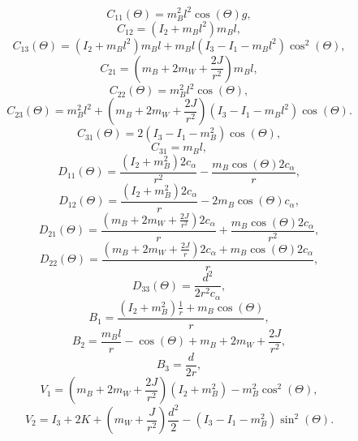 	\begin{equation}
		C_{11}(\Theta) = m_B^2 l^2 \cos(\Theta)g,
	\end{equation}
	\begin{equation}
		C_{12} = (I_2 + m_B l^2) m_B l,
	\end{equation}
	\begin{equation}
		C_{13}(\Theta) = (I_2 + m_B l^2) m_B l + m_B l (I_3 - I_1 - m_B l^2) \cos^2(\Theta),
	\end{equation}
	\begin{equation}
		C_{21} = (m_B + 2m_W + \frac{2J}{r^2}) m_B l,
	\end{equation}
	\begin{equation}
		C_{22}(\Theta) = m_B^2 l^2 \cos(\Theta),
	\end{equation}
	\begin{equation}
		C_{23}(\Theta) = m_B^2 l^2 + (m_B + 2m_W + \frac{2J}{r^2}) (I_3 - I_1 - m_B l^2) \cos(\Theta).
	\end{equation}
	\begin{equation}
		C_{31}(\Theta) = 2 (I_3 - I_1 - m_B^2) \cos(\Theta),
	\end{equation}
	\begin{equation}
		C_{31} = m_B l,
	\end{equation}
	\begin{equation}
		D_{11}(\Theta) = \frac{(I_2 + m_B^2) 2c_\alpha}{r^2} - \frac{m_B \cos(\Theta) 2c_\alpha}{r},
	\end{equation}
	\begin{equation}
		D_{12}(\Theta) = \frac{(I_2 + m_B^2) 2c_\alpha}{r} - 2m_B \cos(\Theta) c_\alpha,
	\end{equation}
	\begin{equation}
		D_{21}(\Theta) = \frac{(m_B + 2m_W + \frac{2J}{r^2}) 2c_\alpha}{r} + \frac{m_B \cos(\Theta) 2c_\alpha}{r^2},
	\end{equation}
	\begin{equation}
		D_{22}(\Theta) = \frac{(m_B + 2m_W + \frac{2J}{r}) 2c_\alpha + m_B \cos(\Theta) 2c_\alpha}{r},
	\end{equation}
	\begin{equation}
		D_{33}(\Theta) = \frac{d^2}{2r^2 c_\alpha},
	\end{equation}
	\begin{equation}
		B_{1} = \frac{(I_2 + m_B^2) \frac{1}{r} + m_B \cos(\Theta)}{r},
	\end{equation}
	\begin{equation}
		B_{2} = \frac{m_B l}{r} - \cos(\Theta) + m_B + 2m_W + \frac{2J}{r^2},
	\end{equation}
	\begin{equation}
		B_{3} = \frac{d}{2r},
	\end{equation}
	\begin{equation}
		V_{1} = (m_B + 2m_W + \frac{2J}{r^2}) (I_2 + m_B^2) - m_B^2 \cos^2(\Theta),
	\end{equation}
	\begin{equation}
		V_{2} = I_3 + 2K + (m_W + \frac{J}{r^2}) \frac{d^2}{2} - (I_3 - I_1 - m_B^2) \sin^2(\Theta).
	\end{equation}



